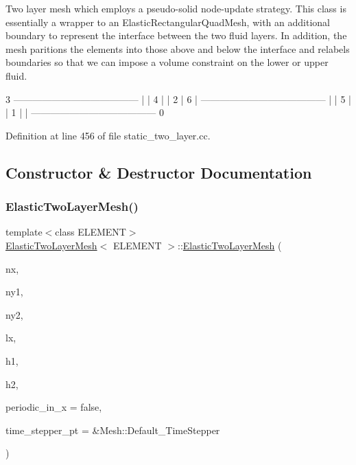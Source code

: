 Two layer mesh which employs a pseudo-\/solid node-\/update strategy. This class is essentially a wrapper to an Elastic\+Rectangular\+Quad\+Mesh, with an additional boundary to represent the interface between the two fluid layers. In addition, the mesh paritions the elements into those above and below the interface and relabels boundaries so that we can impose a volume constraint on the lower or upper fluid. \begin{DoxyVerb}                            3
          ---------------------------------------
          |                                     |
        4 |                                     | 2
          |                 6                   |
          ---------------------------------------
          |                                     |
        5 |                                     | 1
          |                                     |
          ---------------------------------------
                            0  \end{DoxyVerb}
 

Definition at line 456 of file static\+\_\+two\+\_\+layer.\+cc.



\subsection{Constructor \& Destructor Documentation}
\mbox{\label{classElasticTwoLayerMesh_a720be7cd7b0f44df04dcb0d09a2795a7}} 
\subsubsection{\texorpdfstring{Elastic\+Two\+Layer\+Mesh()}{ElasticTwoLayerMesh()}}
{\footnotesize\ttfamily template$<$class E\+L\+E\+M\+E\+NT$>$ \\
\hyperlink{classElasticTwoLayerMesh}{Elastic\+Two\+Layer\+Mesh}$<$ E\+L\+E\+M\+E\+NT $>$\+::\hyperlink{classElasticTwoLayerMesh}{Elastic\+Two\+Layer\+Mesh} (\begin{DoxyParamCaption}\item[{const unsigned \&}]{nx,  }\item[{const unsigned \&}]{ny1,  }\item[{const unsigned \&}]{ny2,  }\item[{const double \&}]{lx,  }\item[{const double \&}]{h1,  }\item[{const double \&}]{h2,  }\item[{const bool \&}]{periodic\+\_\+in\+\_\+x = {\ttfamily false},  }\item[{Time\+Stepper $\ast$}]{time\+\_\+stepper\+\_\+pt = {\ttfamily \&Mesh\+:\+:Default\+\_\+TimeStepper} }\end{DoxyParamCaption})\hspace{0.3cm}{\ttfamily [inline]}}



